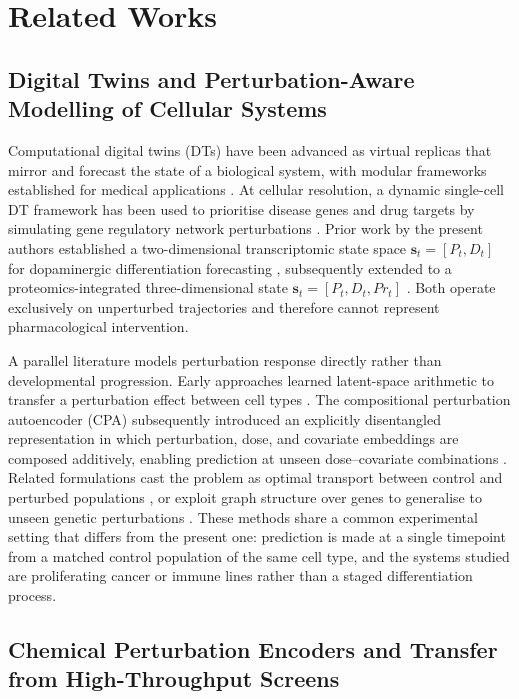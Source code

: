 \documentclass[5p,times,twocolumn]{elsarticle}
\begin{document}
\section{Related Works}

\subsection{\textbf{Digital Twins and Perturbation-Aware Modelling of Cellular Systems}}

Computational digital twins (DTs) have been advanced as virtual replicas that
mirror and forecast the state of a biological system, with modular frameworks
established for medical applications \cite{masison2021modular}. At cellular
resolution, a dynamic single-cell DT framework has been used to prioritise
disease genes and drug targets by simulating gene regulatory network
perturbations \cite{li2022dynamic}. Prior work by the present authors
established a two-dimensional transcriptomic state space
$\mathbf{s}_t = [P_t, D_t]$ for dopaminergic differentiation forecasting
\cite{kanu2026transformer}, subsequently extended to a proteomics-integrated
three-dimensional state $\mathbf{s}_t = [P_t, D_t, Pr_t]$
\cite{kanu2026cmpb}. Both operate exclusively on unperturbed trajectories and
therefore cannot represent pharmacological intervention.

A parallel literature models perturbation response directly rather than
developmental progression. Early approaches learned latent-space arithmetic to
transfer a perturbation effect between cell types \cite{lotfollahi2019scgen}.
The compositional perturbation autoencoder (CPA) subsequently introduced an
explicitly disentangled representation in which perturbation, dose, and
covariate embeddings are composed additively, enabling prediction at unseen
dose--covariate combinations \cite{lotfollahi2023predicting}. Related formulations cast
the problem as optimal transport between control and perturbed populations
\cite{bunne2023learning}, or exploit graph structure over genes to generalise
to unseen genetic perturbations \cite{roohani2024predicting}. These methods share a
common experimental setting that differs from the present one: prediction is
made at a single timepoint from a matched control population of the same cell
type, and the systems studied are proliferating cancer or immune lines rather
than a staged differentiation process.

\subsection{\textbf{Chemical Perturbation Encoders and Transfer from High-Throughput Screens}}
\end{document}
